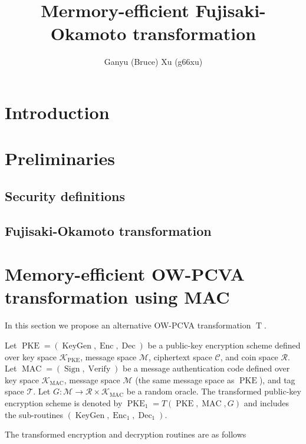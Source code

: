 \documentclass{article}
\title{Mermory-efficient Fujisaki-Okamoto transformation}
\author{Ganyu (Bruce) Xu (g66xu)}
\newcommand{\pke}{\operatorname{PKE}}
\newcommand{\enc}{\operatorname{Enc}}
\newcommand{\dec}{\operatorname{Dec}}
\newcommand{\mac}{\operatorname{MAC}}
\newcommand{\keygen}{\operatorname{KeyGen}}
\begin{document}
\maketitle

\section{Introduction}

\section{Preliminaries}

\subsection{Security definitions}

\subsection{Fujisaki-Okamoto transformation}

\section{Memory-efficient OW-PCVA transformation using MAC}
In this section we propose an alternative OW-PCVA transformation $\operatorname{T}$.

Let $\pke = (\keygen, \enc, \dec)$ be a public-key encryption scheme defined over key space $\mathcal{K}_{\pke}$, message space $\mathcal{M}$, ciphertext space $\mathcal{C}$, and coin space $\mathcal{R}$. Let $\mac = (\operatorname{Sign}, \operatorname{Verify})$ be a message authentication code defined over key space $\mathcal{K}_{\mac}$, message space $\mathcal{M}$ (the same message space as $\pke$), and tag space $\mathcal{T}$. Let $G: \mathcal{M} \rightarrow \mathcal{R} \times \mathcal{K}_{\mac}$ be a random oracle. The transformed public-key encryption scheme is denoted by $\pke_1 = T(\pke, \mac, G)$ and includes the sub-routines $(\keygen, \enc_1, \dec_1)$.

The transformed encryption and decryption routines are as follows
\end{document}
